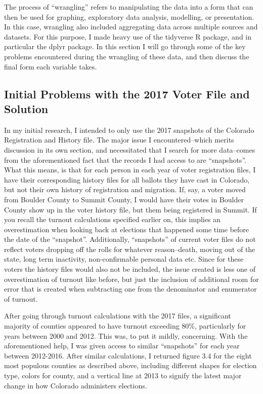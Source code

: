 \documentclass[12pt,twoside]{reedthesis}
\begin{document}
  The process of ``wrangling'' refers to manipulating the data into a form
  that can then be used for graphing, exploratory data analysis,
  modelling, or presentation. In this case, wrangling also included
  aggregating data across multiple sources and datasets. For this purpose,
  I made heavy use of the tidyverse R package, and in particular the dplyr
  package. In this section I will go through some of the key problems
  encountered during the wrangling of these data, and then discuss the
  final form each variable takes.
  
  \subsection{Initial Problems with the 2017 Voter File and
  Solution}\label{initial-problems-with-the-2017-voter-file-and-solution}
  
  In my initial research, I intended to only use the 2017 snapshots of the
  Colorado Registration and History file. The major issue I
  encountered--which merits discussion in its own section, and
  necessitated that I search for more data--comes from the aforementioned
  fact that the records I had access to are ``snapshots''. What this
  means, is that for each person in each year of voter registration files,
  I have their corresponding history files for all ballots they have cast
  in Colorado, but not their own history of registration and migration.
  If, say, a voter moved from Boulder County to Summit County, I would
  have their votes in Boulder County show up in the voter history file,
  but them being registered in Summit. If you recall the turnout
  calculations specified earlier on, this implies an overestimation when
  looking back at elections that happened some time before the date of the
  ``snapshot''. Additionally, ``snapshots'' of current voter files do not
  reflect voters dropping off the rolls for whatever reason--death, moving
  out of the state, long term inactivity, non-confirmable personal data
  etc. Since for these voters the history files would also not be
  included, the issue created is less one of overestimation of turnout
  like before, but just the inclusion of additional room for error that is
  created when subtracting one from the denominator and enumerator of
  turnout.
  
  After going through turnout calculations with the 2017 files, a
  significant majority of counties appeared to have turnout exceeding
  80\%, particularly for years between 2000 and 2012. This was, to put it
  mildly, concerning. With the aforementioned help, I was given access to
  similar ``snapshots'' for each year between 2012-2016. After similar
  calculations, I returned figure 3.4 for the eight most populous counties
  as described above, including different shapes for election type, colors
  for county, and a vertical line at 2013 to signify the latest major
  change in how Colorado administers elections.
  
\end{document}
